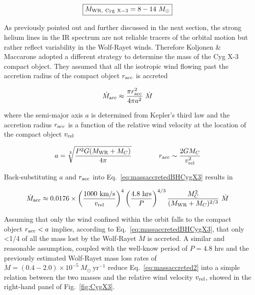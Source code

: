 \documentclass[a4paper,titlepage]{book}     	%
\newcommand{\sun}{\ensuremath{_\odot}}
\newcommand{\mdot}{\ensuremath{\dot{M}}}
\newcommand{\msun}{\ensuremath{M\sun}}
\newcommand{\yr}{\text{yr}}
\newcommand{\mwr}{\ensuremath{M_\textup{WR}}}
\begin{document}
\begin{equation}\label{eq:MWRCygxX-3}
    \boxed{M_{\rm WR,~Cyg~X-3} = 8-14~\msun}
\end{equation}

As previously pointed out and further discussed in the next section, the strong helium lines in the IR spectrum are not reliable tracers of the orbital motion but rather reflect variability in the Wolf-Rayet winds. Therefore Koljonen \& Maccarone adopted a different strategy to determine the mass of the Cyg X-3 compact object. They assumed that all the isotropic wind flowing past the accretion radius of the compact object $r_{\rm acc}$ is accreted

\begin{equation}\label{eq:massaccretedBHCygX3}
    \mdot_{\rm acc} \approx \frac{\pi r_{\rm acc}^2}{4 \pi a^2} ~ \mdot
\end{equation}

where the semi-major axis $a$ is determined from Kepler's third law and the accretion radius $r_{\rm acc}$ is a function of the relative wind velocity at the location of the compact object $v_{\rm rel}$

\begin{equation}
    a = \sqrt[3]{\frac{P^2 G (\mwr + M_C)}{4 \pi}} \qquad \qquad r_{\rm acc} \sim \frac{2 G M_C}{v_{\rm rel}^2} 
\end{equation}

Back-substituting $a$ and $r_{\rm acc}$ into Eq.\ \ref{eq:massaccretedBHCygX3} results in

\begin{equation}\label{eq:massaccreted2}
    \mdot_{\rm acc} \approx 0.0176 \times \left( \frac{1000~\rm km/s}{v_{\rm rel}} \right)^4 \left( \frac{4.8~\text{hrs}}{P} \right)^{4/3} \frac{M_C^2}{(\mwr + M_C)^{2/3}}   ~ \mdot
\end{equation}

Assuming that only the wind confined within the orbit falls to the compact object $r_{\rm acc} < a$ implies, according to Eq.\ \ref{eq:massaccretedBHCygX3}, that only <1/4 of all the mass lost by the Wolf-Rayet $\mdot$ is accreted. A similar and reasonable assumption, coupled with the well-know period of $P=4.8$ hrs \cite{CygX-3_Singh2002} and the previously estimated Wolf-Rayet mass loss rates of $\mdot = (0.4-2.0)\times 10^{-5}~\msun~\yr^{-1}$ \cite{CygX-3_Koljonen2017} reduce Eq.\ \ref{eq:massaccreted2} into a simple relation between the two masses and the relative wind velocity $v_{\rm rel}$, showed in the right-hand panel of Fig.\ \ref{fig:CygX3}. 
\end{document}
